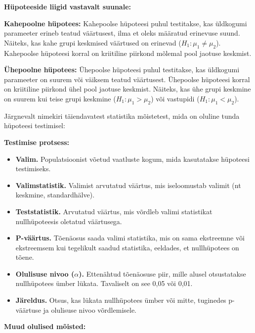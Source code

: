 \documentclass[
]{book}
\providecommand{\tightlist}{%
  \setlength{\itemsep}{0pt}\setlength{\parskip}{0pt}}
\begin{document}
\textbf{Hüpoteeside liigid vastavalt suunale:}

\textbf{Kahepoolne hüpotees:} Kahepoolse hüpoteesi puhul testitakse, kas üldkogumi parameeter erineb teatud väärtusest, ilma et oleks määratud erinevuse suund. Näiteks, kas kahe grupi keskmised väärtused on erinevad (\(H_1: \mu_1 \neq \mu_2\)). Kahepoolse hüpoteesi korral on kriitiline piirkond mõlemal pool jaotuse keskmist.

\textbf{Ühepoolne hüpotees:} Ühepoolse hüpoteesi puhul testitakse, kas üldkogumi parameeter on suurem või väiksem teatud väärtusest. Ühepoolse hüpoteesi korral on kriitiline piirkond ühel pool jaotuse keskmist. Näiteks, kas ühe grupi keskmine on suurem kui teise grupi keskmine (\(H_1: \mu_1 > \mu_2\)) või vastupidi (\(H_1: \mu_1 < \mu_2\)).

Järgnevalt nimekiri täiendavatest statistika mõistetest, mida on oluline tunda hüpoteesi testimisel:

\textbf{Testimise protsess:}

\begin{itemize}
\tightlist
\item
  \textbf{Valim.} Populatsioonist võetud vaatluste kogum, mida kasutatakse hüpoteesi testimiseks.
\item
  \textbf{Valimstatistik.} Valimist arvutatud väärtus, mis iseloomustab valimit (nt keskmine, standardhälve).
\item
  \textbf{Teststatistik.} Arvutatud väärtus, mis võrdleb valimi statistikat nullhüpoteesis oletatud väärtusega.
\item
  \textbf{P-väärtus.} Tõenäosus saada valimi statistika, mis on sama ekstreemne või ekstreemsem kui tegelikult saadud statistika, eeldades, et nullhüpotees on tõene.
\item
  \textbf{Olulisuse nivoo (\(\alpha\)).} Ettenähtud tõenäosuse piir, mille alusel otsustatakse nullhüpotees ümber lükata. Tavaliselt on see 0,05 või 0,01.
\item
  \textbf{Järeldus.} Otsus, kas lükata nullhüpotees ümber või mitte, tuginedes p-väärtuse ja olulisuse nivoo võrdlemisele.
\end{itemize}

\textbf{Muud olulised mõisted:}
\end{document}
